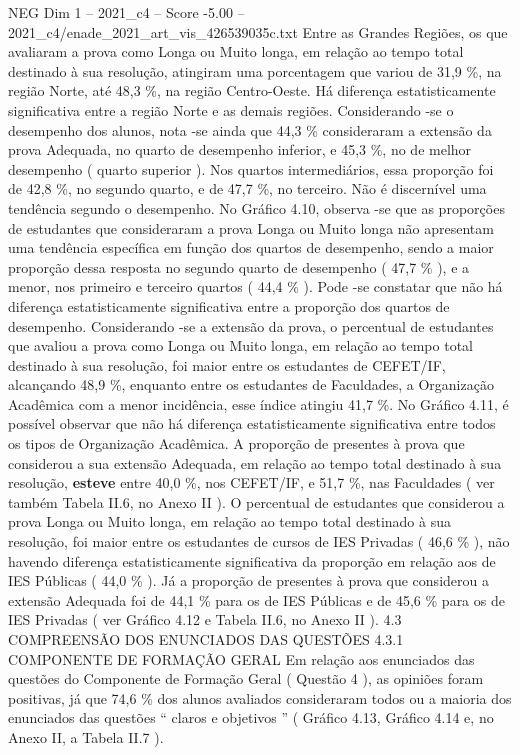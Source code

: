 \begin{textsample}{NEG Dim 1 – 2021\_c4 – Score -5.00 – 2021\_c4/enade\_2021\_art\_vis\_426539035c.txt}
Entre as Grandes Regiões, os que avaliaram a prova como Longa ou Muito longa, em relação ao tempo total destinado à sua resolução, atingiram uma porcentagem que variou de 31,9 \%, na região Norte, até 48,3 \%, na região Centro-Oeste.
Há diferença estatisticamente significativa entre a região Norte e as demais regiões.
Considerando -se o desempenho dos alunos, nota -se ainda que 44,3 \% consideraram a extensão da prova Adequada, no quarto de desempenho inferior, e 45,3 \%, no de melhor desempenho ( quarto superior ).
Nos quartos intermediários, essa proporção foi de 42,8 \%, no segundo quarto, e de 47,7 \%, no terceiro.
Não é discernível uma tendência segundo o desempenho.
No Gráfico 4.10, observa -se que as proporções de estudantes que consideraram a prova Longa ou Muito longa não apresentam uma tendência específica em função dos quartos de desempenho, sendo a maior proporção dessa resposta no segundo quarto de desempenho ( 47,7 \% ), e a menor, nos primeiro e terceiro quartos ( 44,4 \% ).
Pode -se constatar que não há diferença estatisticamente significativa entre a proporção dos quartos de desempenho.
Considerando -se a extensão da prova, o percentual de estudantes que avaliou a prova como Longa ou Muito longa, em relação ao tempo total destinado à sua resolução, foi maior entre os estudantes de CEFET/IF, alcançando 48,9 \%, enquanto entre os estudantes de Faculdades, a Organização Acadêmica com a menor incidência, esse índice atingiu 41,7 \%.
No Gráfico 4.11, é possível observar que não há diferença estatisticamente significativa entre todos os tipos de Organização Acadêmica.
A proporção de presentes à prova que considerou a sua extensão Adequada, em relação ao tempo total destinado à sua resolução, \textbf{esteve} entre 40,0 \%, nos CEFET/IF, e 51,7 \%, nas Faculdades ( ver também Tabela II.6, no Anexo II ).
O percentual de estudantes que considerou a prova Longa ou Muito longa, em relação ao tempo total destinado à sua resolução, foi maior entre os estudantes de cursos de IES Privadas ( 46,6 \% ), não havendo diferença estatisticamente significativa da proporção em relação aos de IES Públicas ( 44,0 \% ).
Já a proporção de presentes à prova que considerou a extensão Adequada foi de 44,1 \% para os de IES Públicas e de 45,6 \% para os de IES Privadas ( ver Gráfico 4.12 e Tabela II.6, no Anexo II ). 4.3 COMPREENSÃO DOS ENUNCIADOS DAS QUESTÕES 4.3.1 COMPONENTE DE FORMAÇÃO GERAL Em relação aos enunciados das questões do Componente de Formação Geral ( Questão 4 ), as opiniões foram positivas, já que 74,6 \% dos alunos avaliados consideraram todos ou a maioria dos enunciados das questões “ claros e objetivos ” ( Gráfico 4.13, Gráfico 4.14 e, no Anexo II, a Tabela II.7 ).

\end{textsample}
